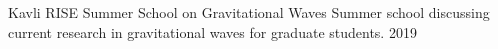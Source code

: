 



\begin{cvhonors}
  \cvhonor
    {Kavli RISE Summer School on Gravitational Waves} %
    {Summer school discussing current research in gravitational waves for graduate students.} %
    {} %
    {2019} %




\end{cvhonors}